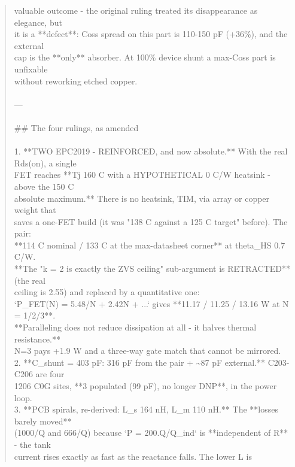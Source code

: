 \documentclass[11pt,a4paper]{article}
\begin{document}
\begin{quote}
valuable outcome - the original ruling treated its disappearance as elegance, but\\
it is a {*}{*}defect{*}{*}: Coss spread on this part is 110-150 pF (+36\%), and the external\\
cap is the {*}{*}only{*}{*} absorber. At 100\% device shunt a max-Coss part is unfixable\\
without reworking etched copper.\\
~\\
---\\
~\\
\#\# The four rulings, as amended\\
~\\
1. {*}{*}TWO EPC2019 - REINFORCED, and now absolute.{*}{*} With the real Rds(on), a single\\
   FET reaches {*}{*}Tj 160 C with a HYPOTHETICAL 0 C/W heatsink - above the 150 C\\
   absolute maximum.{*}{*} There is no heatsink, TIM, via array or copper weight that\\
   saves a one-FET build (it was "138 C against a 125 C target" before). The pair:\\
   {*}{*}114 C nominal / 133 C at the max-datasheet corner{*}{*} at theta\_HS 0.7 C/W.\\
   {*}{*}The "k = 2 is exactly the ZVS ceiling" sub-argument is RETRACTED{*}{*} (the real\\
   ceiling is 2.55) and replaced by a quantitative one:\\
   `P\_FET(N) = 5.48/N + 2.42N + ...` gives {*}{*}11.17 / 11.25 / 13.16 W at N = 1/2/3{*}{*}.\\
   {*}{*}Paralleling does not reduce dissipation at all - it halves thermal resistance.{*}{*}\\
   N=3 pays +1.9 W and a three-way gate match that cannot be mirrored.\\
2. {*}{*}C\_shunt = 403 pF: 316 pF from the pair + \textasciitilde{}87 pF external.{*}{*} C203-C206 are four\\
   1206 C0G sites, {*}{*}3 populated (99 pF), no longer DNP{*}{*}, in the power loop.\\
3. {*}{*}PCB spirals, re-derived: L\_s 164 nH, L\_m 110 nH.{*}{*} The {*}{*}losses barely moved{*}{*}\\
   (1000/Q and 666/Q) because `P = 200.Q/Q\_ind` is {*}{*}independent of R{*}{*} - the tank\\
   current rises exactly as fast as the reactance falls. The lower L is\\

\end{quote}
\end{document}
